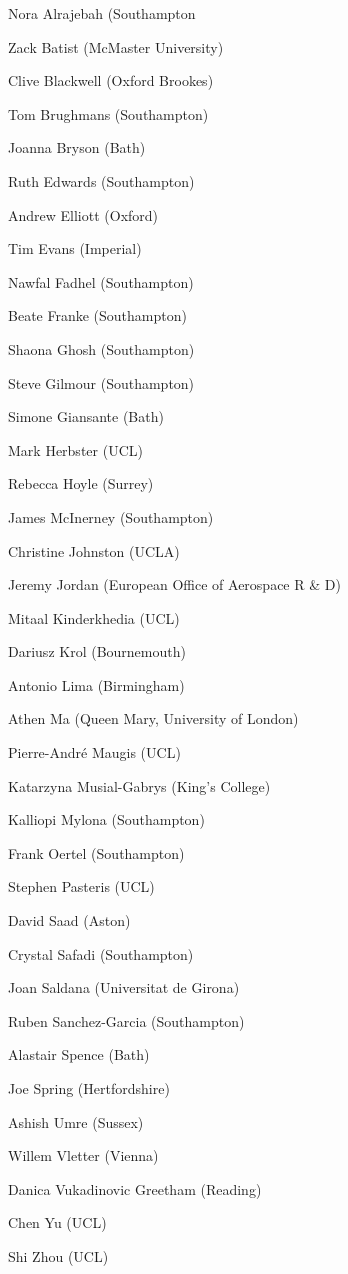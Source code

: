 \documentclass[10pt]{article}
\newenvironment{packed_item}{
\begin{itemize}
  \setlength{\itemsep}{1pt}
  \setlength{\parskip}{0pt}
  \setlength{\parsep}{0pt}
}{\end{itemize}}
\begin{document}
\begin{multicols}{2}
\begin{packed_item}
\item  Nora Alrajebah (Southampton
\item  Zack Batist (McMaster University)
\item  Clive Blackwell (Oxford Brookes)
\item  Tom Brughmans (Southampton)
\item  Joanna Bryson (Bath)
\item  Ruth Edwards (Southampton)
\item  Andrew Elliott (Oxford)
\item  Tim Evans (Imperial)
\item  Nawfal Fadhel (Southampton)
\item  Beate Franke (Southampton)
\item  Shaona Ghosh (Southampton)
\item  Steve Gilmour (Southampton)
\item  Simone Giansante (Bath)
\item  Mark Herbster (UCL)
\item  Rebecca Hoyle (Surrey)
\item  James McInerney (Southampton)
\item  Christine Johnston (UCLA)
\item  Jeremy Jordan (European Office of Aerospace R \& D)
\item  Mitaal Kinderkhedia (UCL)
\item  Dariusz Krol (Bournemouth)
\item  Antonio Lima (Birmingham)
\item  Athen Ma (Queen Mary, University of London)
\item  Pierre-André Maugis (UCL)
\item  Katarzyna Musial-Gabrys (King’s College)
\item  Kalliopi Mylona (Southampton)
\item  Frank Oertel (Southampton)
\item  Stephen Pasteris (UCL)
\item  David Saad (Aston)
\item  Crystal Safadi (Southampton)
\item  Joan Saldana (Universitat de Girona)
\item  Ruben Sanchez-Garcia (Southampton)
\item  Alastair Spence (Bath)
\item  Joe Spring (Hertfordshire)
\item  Ashish Umre (Sussex)
\item  Willem Vletter (Vienna)
\item  Danica Vukadinovic Greetham (Reading)
\item  Chen Yu (UCL)
\item  Shi Zhou (UCL)
\end{packed_item}


\end{multicols}
\end{document}
